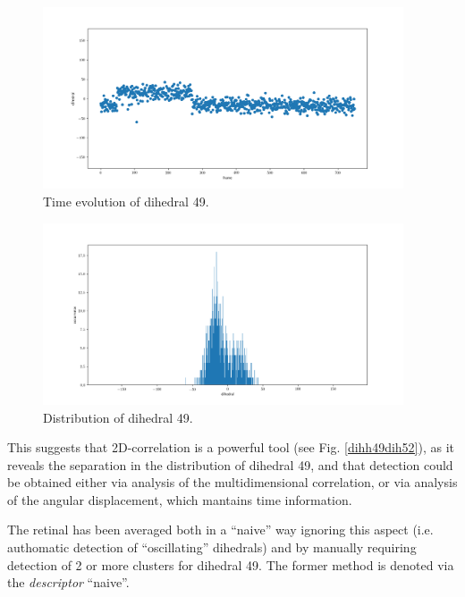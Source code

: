 \documentclass[twoside, 12pt]{article}
\begin{document}
\begin{figure}[H]
\centering
\includegraphics[width=0.95\textwidth]{./figures/dih49_evo.png}
\caption{Time evolution of dihedral 49.} 
\label{fig:dih49evo}
\end{figure}

\begin{figure}[H]
\centering
\includegraphics[width=0.95\textwidth]{./figures/dih49_distrib.png}
\caption{Distribution of dihedral 49.} 
\label{fig:dih49distrib}
\end{figure}

This suggests that 2D-correlation is a powerful tool (see Fig. \ref{dihh49dih52}), as it reveals the separation in the distribution of dihedral 49, and that detection could be obtained either via analysis of the multidimensional correlation, or via analysis of the angular displacement, which mantains time information.

The retinal has been averaged both in a ``naive'' way ignoring this aspect (i.e. authomatic detection of ``oscillating'' dihedrals) and by manually requiring detection of 2 or more clusters for dihedral 49. The former method is denoted via the \textit{descriptor} ``naive''.
\end{document}
